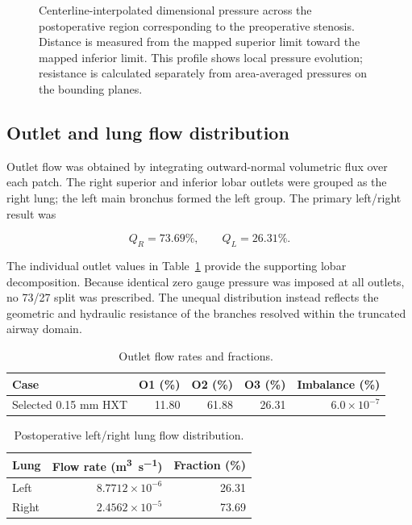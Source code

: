 \documentclass[11pt,a4paper]{article}
\begin{document}
\begin{figure}[htbp]
  \centering
  \resizebox{0.95\textwidth}{!}{}
  \caption{Centerline-interpolated dimensional pressure across the postoperative
  region corresponding to the preoperative stenosis. Distance is measured from
  the mapped superior limit toward the mapped inferior limit. This profile shows
  local pressure evolution; resistance is calculated separately from
  area-averaged pressures on the bounding planes.}
  \label{fig:centerline_pressure}
\end{figure}

\subsection{Outlet and lung flow distribution}

Outlet flow was obtained by integrating outward-normal volumetric flux over each
patch. The right superior and inferior lobar outlets were grouped as the right
lung; the left main bronchus formed the left group. The primary left/right result
was

\begin{equation}
  Q_R = 73.69\%, \qquad Q_L = 26.31\%.
\end{equation}

The individual outlet values in Table~\ref{tab:outlet_flow} provide the supporting
lobar decomposition. Because identical zero gauge pressure was imposed at all
outlets, no 73/27 split was prescribed. The unequal distribution instead reflects
the geometric and hydraulic resistance of the branches resolved within the
truncated airway domain.

\begin{table}[htbp]
  \centering
  \caption{Outlet flow rates and fractions.}
  \label{tab:outlet_flow}
  \begin{tabular}{@{}lrrrr@{}}
    \toprule
    Case & O1 (\%) & O2 (\%) & O3 (\%) & Imbalance (\%) \\
    \midrule
    Selected 0.15 mm HXT & 11.80 & 61.88 & 26.31 & $6.0\times10^{-7}$ \\
    \bottomrule
  \end{tabular}
\end{table}

\begin{table}[htbp]
  \centering
  \caption{Postoperative left/right lung flow distribution.}
  \label{tab:lung_flow}
  \begin{tabular}{@{}lrr@{}}
    \toprule
    Lung & Flow rate (\si{\metre\cubed\per\second}) & Fraction (\%) \\
    \midrule
    Left  & $8.7712\times10^{-6}$ & 26.31 \\
    Right & $2.4562\times10^{-5}$ & 73.69 \\
    \bottomrule
  \end{tabular}
\end{table}
\end{document}
